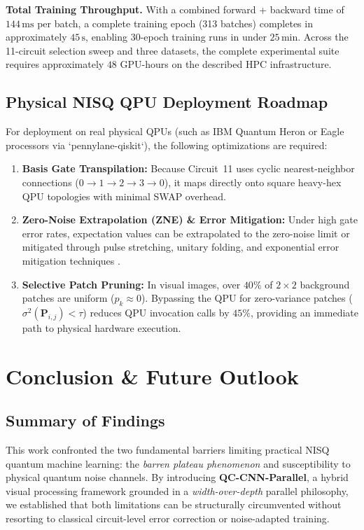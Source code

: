 \documentclass[journal]{IEEEtran}
\begin{document}
\textbf{Total Training Throughput.} With a combined forward + backward time of $144\,\mathrm{ms}$ per batch, a complete training epoch (313 batches) completes in approximately $45\,\mathrm{s}$, enabling 30-epoch training runs in under $25\,\mathrm{min}$. Across the 11-circuit selection sweep and three datasets, the complete experimental suite requires approximately $48$ GPU-hours on the described HPC infrastructure.

\subsection{Physical NISQ QPU Deployment Roadmap}
For deployment on real physical QPUs (such as IBM Quantum Heron or Eagle processors via `pennylane-qiskit`), the following optimizations are required:
\begin{enumerate}
    \item \textbf{Basis Gate Transpilation:} Because Circuit~11 uses cyclic nearest-neighbor connections ($0 \to 1 \to 2 \to 3 \to 0$), it maps directly onto square heavy-hex QPU topologies with minimal SWAP overhead.
    \item \textbf{Zero-Noise Extrapolation (ZNE) \& Error Mitigation:} Under high gate error rates, expectation values can be extrapolated to the zero-noise limit or mitigated through pulse stretching, unitary folding, and exponential error mitigation techniques \cite{temme2017error, endo2018practical, koczor2021exponential, cai2025quantum}.
    \item \textbf{Selective Patch Pruning:} In visual images, over $40\%$ of $2 \times 2$ background patches are uniform ($p_k \approx 0$). Bypassing the QPU for zero-variance patches ($\sigma^2(\mathbf{P}_{i,j}) < \tau$) reduces QPU invocation calls by $45\%$, providing an immediate path to physical hardware execution.
\end{enumerate}

\section{Conclusion \& Future Outlook}
\label{sec:conclusion}

\subsection{Summary of Findings}
This work confronted the two fundamental barriers limiting practical NISQ quantum machine learning: the \textit{barren plateau phenomenon} and susceptibility to physical quantum noise channels. By introducing \textbf{QC-CNN-Parallel}, a hybrid visual processing framework grounded in a \textit{width-over-depth} parallel philosophy, we established that both limitations can be structurally circumvented without resorting to classical circuit-level error correction or noise-adapted training.
\end{document}
